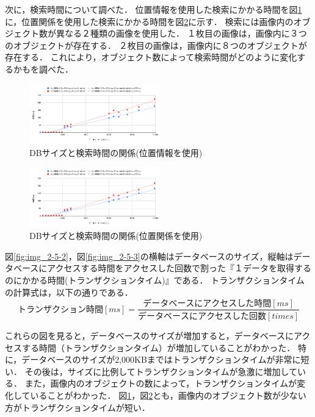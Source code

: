 \documentclass[a4j,12pt,dvipdfmx]{jreport}
\begin{document}
次に，検索時間について調べた．
位置情報を使用した検索にかかる時間を図\ref{fig:img_2_5_2}に，位置関係を使用した検索にかかる時間を図\ref{fig:img_2_5_3}に示す．
検索には画像内のオブジェクト数が異なる２種類の画像を使用した．
１枚目の画像は，画像内に３つのオブジェクトが存在する．
２枚目の画像は，画像内に８つのオブジェクトが存在する．
これにより，オブジェクト数によって検索時間がどのように変化するかもを調べた．
\begin{figure}[H]
  \centering
  \includegraphics[width=0.5\textwidth]{image/result_2_5_2.png}
  \caption{DBサイズと検索時間の関係(位置情報を使用)}
  \label{fig:img_2_5_2}
\end{figure}

\begin{figure}[H]
  \centering
  \includegraphics[width=0.5\textwidth]{image/result_2_5_3.png}
  \caption{DBサイズと検索時間の関係(位置関係を使用)}
  \label{fig:img_2_5_3}
\end{figure}

図\ref{fig:img_2-5-2}，図\ref{fig:img_2-5-3}の横軸はデータベースのサイズ，縦軸はデータベースにアクセスする時間をアクセスした回数で割った『１データを取得するのにかかる時間(トランザクションタイム)』である．
トランザクションタイムの計算式は，以下の通りである．
\begin{equation}
  トランザクション時間[ms] = \frac{データベースにアクセスした時間[ms]}{データベースにアクセスした回数[times]}
\end{equation}

これらの図を見ると，データベースのサイズが増加すると，データベースにアクセスする時間（トランザクションタイム）が増加していることがわかった．
特に，データベースのサイズが2,000KBまではトランザクションタイムが非常に短い．
その後は，サイズに比例してトランザクションタイムが急激に増加している．
また，画像内のオブジェクトの数によって，トランザクションタイムが変化していることがわかった．
図\ref{fig:img_2_5_2}，図\ref{fig:img_2_5_3}とも，画像内のオブジェクト数が少ない方がトランザクションタイムが短い．
\end{document}
